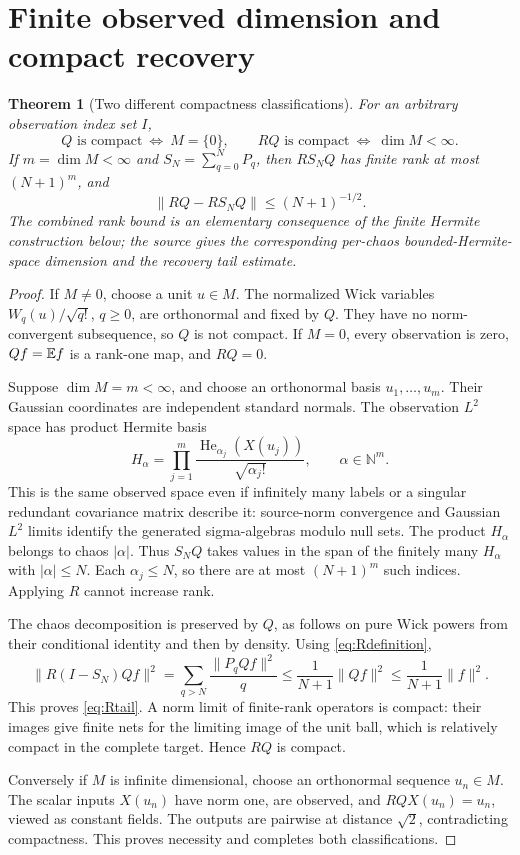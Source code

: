 \documentclass[11pt]{article}
\newtheorem{theorem}{Theorem}[section]
\begin{document}
\section{Finite observed dimension and compact recovery}
\begin{theorem}[Two different compactness classifications]\label{thm:compactobs}
For an arbitrary observation index set $I$,
\[
 Q\text{ is compact}\ \Longleftrightarrow\ M=\{0\},\qquad
 RQ\text{ is compact}\ \Longleftrightarrow\ \dim M<\infty.
\]
If $m=\dim M<\infty$ and $S_N=\sum_{q=0}^NP_q$, then
$RS_NQ$ has finite rank at most $(N+1)^m$, and
\begin{equation}\label{eq:Rtail}
 \|RQ-RS_NQ\|\leq(N+1)^{-1/2}.
\end{equation}
The combined rank bound is an elementary consequence of the finite
Hermite construction below; the source gives the corresponding
per-chaos bounded-Hermite-space dimension and the recovery tail estimate.
\end{theorem}
\begin{proof}
If $M\ne0$, choose a unit $u\in M$. The normalized Wick variables
$W_q(u)/\sqrt{q!}$, $q\geq0$, are orthonormal and fixed by $Q$.
They have no norm-convergent subsequence, so $Q$ is not compact.
If $M=0$, every observation is zero, $Qf=\mathbb E f$ is a rank-one map,
and $RQ=0$.

Suppose $\dim M=m<\infty$, and choose an orthonormal basis
$u_1,\ldots,u_m$. Their Gaussian coordinates are independent standard
normals. The observation $L^2$ space has product Hermite basis
\[
 H_\alpha=\prod_{j=1}^m
       \frac{\operatorname{He}_{\alpha_j}(X(u_j))}{\sqrt{\alpha_j!}},
 \qquad \alpha\in\mathbb N^m.
\]
This is the same observed space even if infinitely many labels or a
singular redundant covariance matrix describe it: source-norm convergence
and Gaussian $L^2$ limits identify the generated sigma-algebras modulo
null sets. The product $H_\alpha$ belongs to chaos $|\alpha|$.
Thus $S_NQ$ takes values in the span of the finitely many $H_\alpha$
with $|\alpha|\leq N$. Each $\alpha_j\leq N$, so there are at most
$(N+1)^m$ such indices. Applying $R$ cannot increase rank.

The chaos decomposition is preserved by $Q$, as follows on pure Wick
powers from their conditional identity and then by density. Using
\eqref{eq:Rdefinition},
\[
 \|R(I-S_N)Qf\|^2
   =\sum_{q>N}\frac{\|P_qQf\|^2}{q}
   \leq\frac1{N+1}\|Qf\|^2
   \leq\frac1{N+1}\|f\|^2.
\]
This proves \eqref{eq:Rtail}. A norm limit of finite-rank operators
is compact: their images give finite nets for the limiting image of
the unit ball, which is relatively compact in the complete target.
Hence $RQ$ is compact.

Conversely if $M$ is infinite dimensional, choose an orthonormal
sequence $u_n\in M$. The scalar inputs $X(u_n)$ have norm one,
are observed, and $RQX(u_n)=u_n$, viewed as constant fields.
The outputs are pairwise at distance $\sqrt2$, contradicting
compactness. This proves necessity and completes both classifications.
\end{proof}
\end{document}
